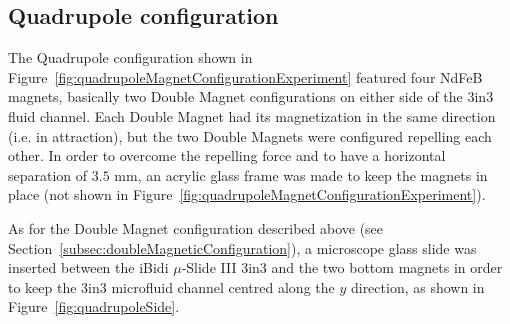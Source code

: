 \subsection{Quadrupole configuration}\label{subsec:quadrupoleMagneticConfiguration}
The Quadrupole configuration shown in Figure~\ref{fig:quadrupoleMagnetConfigurationExperiment} featured four NdFeB magnets, basically two Double Magnet configurations on either side of the 3in3 fluid channel. Each Double Magnet had its magnetization in the same direction (i.e. in attraction), but the two Double Magnets were configured repelling each other. In order to overcome the repelling force and to have a horizontal separation of $3.5$ mm, an acrylic glass frame was made to keep the magnets in place (not shown in Figure~\ref{fig:quadrupoleMagnetConfigurationExperiment}).

As for the Double Magnet configuration described above (see Section~\ref{subsec:doubleMagneticConfiguration}), a microscope glass slide was inserted between the iBidi $\mu$-Slide III 3in3 and the two bottom magnets in order to keep the 3in3 microfluid channel centred along the $y$ direction, as shown in Figure~\ref{fig:quadrupoleSide}.

